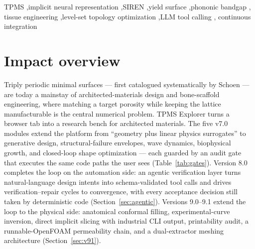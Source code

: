 \documentclass[5p,times,authoryear]{elsarticle}
\begin{document}
\begin{frontmatter}
\begin{keyword}
TPMS \sep implicit neural representation \sep SIREN \sep yield surface \sep phononic bandgap \sep
tissue engineering \sep level-set topology optimization \sep LLM tool calling \sep
continuous integration
\end{keyword}

\end{frontmatter}

\section{Impact overview}
Triply periodic minimal surfaces --- first catalogued systematically by Schoen
\cite{schoen1970infinite} --- are today a mainstay of architected-materials design and
bone-scaffold engineering, where matching a target porosity while keeping the lattice
manufacturable is the central numerical problem. TPMS Explorer turns a browser tab into a
research bench for architected materials. The five v7.0
modules extend the platform from ``geometry plus linear physics surrogates'' to generative design,
structural-failure envelopes, wave dynamics, biophysical growth, and closed-loop shape optimization
--- each guarded by an audit gate that executes the same code paths the user sees
(Table~\ref{tab:gates}). Version 8.0 completes the loop on the automation side: an agentic
verification layer turns natural-language design intents into schema-validated tool calls and drives
verification--repair cycles to convergence, with every acceptance decision still taken by
deterministic code (Section~\ref{sec:agentic}). Versions 9.0--9.1 extend the loop to the
physical side: anatomical conformal filling, experimental-curve inversion, direct implicit
slicing with industrial CLI output, printability audit, a runnable-OpenFOAM permeability
chain, and a dual-extractor meshing architecture (Section~\ref{sec:v91}).
\end{document}
